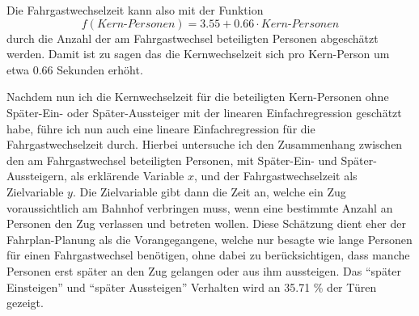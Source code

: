 Die Fahrgastwechselzeit kann also mit der Funktion 
\begin{equation}
f(Kern\text{-}Personen) = 3.55 + 0.66 \cdot Kern\text{-}Personen
\end{equation}  
durch die Anzahl der am Fahrgastwechsel beteiligten Personen abgeschätzt werden. Damit ist zu sagen das die Kernwechselzeit sich pro Kern-Person um etwa $0.66$ Sekunden erhöht.

Nachdem nun ich die Kernwechselzeit für die beteiligten Kern-Personen ohne Später-Ein- oder Später-Aussteiger mit der linearen Einfachregression geschätzt habe, führe ich nun auch eine lineare Einfachregression für die Fahrgastwechselzeit durch. Hierbei untersuche ich den Zusammenhang zwischen den am Fahrgastwechsel beteiligten Personen, mit Später-Ein- und Später-Aussteigern, als erklärende Variable $x$, und der Fahrgastwechselzeit als Zielvariable $y$. Die Zielvariable gibt dann die Zeit an, welche ein Zug voraussichtlich am Bahnhof verbringen muss, wenn eine bestimmte Anzahl an Personen den Zug verlassen und betreten wollen. Diese Schätzung dient eher der Fahrplan-Planung als die Vorangegangene, welche nur besagte wie lange Personen für einen Fahrgastwechsel benötigen, ohne dabei zu berücksichtigen, dass manche Personen erst später an den Zug gelangen oder aus ihm aussteigen. Das "`später Einsteigen"' und "`später Aussteigen"' Verhalten wird an 35.71 \% der Türen gezeigt.

